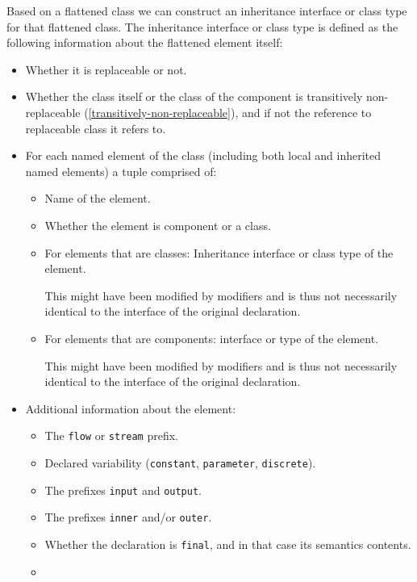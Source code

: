 Based on a flattened class we can construct an inheritance interface or
class type for that flattened class. The inheritance interface or class
type is defined as the following information about the flattened element
itself:
\begin{itemize}
\item
  Whether it is replaceable or not.
\item
  Whether the class itself or the class of the component is transitively
  non-replaceable (\cref{transitively-non-replaceable}), and if not the reference to
  replaceable class it refers to.
\item
  For each named element of the class (including both local and
  inherited named elements) a tuple comprised of:
  \begin{itemize}
  \item
    Name of the element.
  \item
    Whether the element is component or a class.
  \item
    For elements that are classes: Inheritance interface or class type of the element.
    \begin{nonnormative}
    This might have been modified by modifiers and is thus not necessarily identical to the interface of the original declaration.
    \end{nonnormative}
  \item
    For elements that are components: interface or type of the element.
    \begin{nonnormative}
    This might have been modified by modifiers and is thus not necessarily identical to the interface of the original declaration.
    \end{nonnormative}
  \end{itemize}
\item
  Additional information about the element:
  \begin{itemize}
  \item
    The \lstinline!flow! or \lstinline!stream! prefix.
  \item
    Declared variability (\lstinline!constant!, \lstinline!parameter!, \lstinline!discrete!).
  \item
    The prefixes \lstinline!input! and \lstinline!output!.
  \item
    The prefixes \lstinline!inner! and/or \lstinline!outer!.
  \item
    Whether the declaration is \lstinline!final!, and in that case its semantics
    contents.
  \item

\end{itemize}
\end{itemize}

